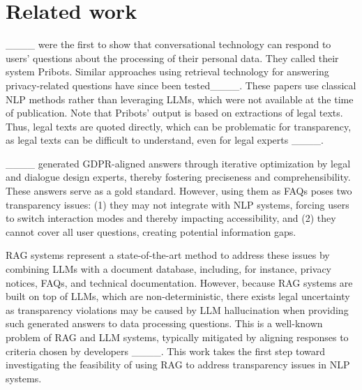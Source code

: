 \section{Related work}
____ were the first to show that conversational technology can respond to users' questions about the processing of their personal data. They called their system Pribots. Similar approaches using retrieval technology for answering privacy-related questions have since been tested____. These papers use classical NLP methods rather than leveraging LLMs, which were not available at the time of publication. Note that Pribots' output is based on extractions of legal texts. Thus, legal texts are quoted directly, which can be problematic for transparency, as legal texts can be difficult to understand, even for legal experts ____.


____ generated GDPR-aligned answers through iterative optimization by legal and dialogue design experts, thereby fostering preciseness and comprehensibility. These answers serve as a gold standard. However, using them as FAQs poses two transparency issues: (1) they may not integrate with NLP systems, forcing users to switch interaction modes and thereby impacting accessibility, and (2) they cannot cover all user questions, creating potential information gaps.

RAG systems represent a state-of-the-art method to address these issues by combining LLMs with a document database, including, for instance, privacy notices, FAQs, and technical documentation. However, because RAG systems are built on top of LLMs, which are non-deterministic, there exists legal uncertainty as transparency violations may be caused by LLM hallucination when providing such generated answers to data processing questions. This is a well-known problem of RAG and LLM systems, typically mitigated by aligning responses to criteria chosen by developers ____. This work takes the first step toward investigating the feasibility of using RAG to address transparency issues in NLP systems.